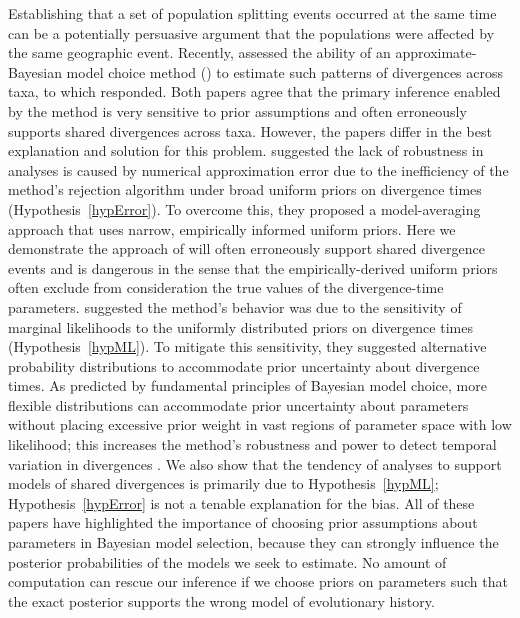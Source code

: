 Establishing that a set of population splitting events occurred at the same
time can be a potentially persuasive argument that the populations were
affected by the same geographic event.
Recently, \citet{Oaks2012} assessed the ability of an approximate-Bayesian
model choice method (\msb) to estimate such patterns of divergences across
taxa, to which \citet{Hickerson2013} responded.
Both papers agree that the primary inference enabled by the method is very
sensitive to prior assumptions and often erroneously supports shared
divergences across taxa.
However, the papers differ in the best explanation and solution for this
problem.
\citet{Hickerson2013} suggested the lack of robustness in \msb analyses is
caused by numerical approximation error due to the inefficiency of the method's
rejection algorithm under broad uniform priors on divergence times
(Hypothesis~\ref{hypError}).
To overcome this, they proposed a model-averaging approach that uses narrow,
empirically informed uniform priors.
Here we demonstrate the approach of \citet{Hickerson2013} will often
erroneously support shared divergence events and is dangerous in the sense that
the empirically-derived uniform priors often exclude from consideration the
true values of the divergence-time parameters.
\citet{Oaks2012} suggested the method's behavior was due to the sensitivity of
marginal likelihoods to the uniformly distributed priors on divergence times
(Hypothesis~\ref{hypML}).
To mitigate this sensitivity, they suggested alternative probability
distributions to accommodate prior uncertainty about divergence times.
As predicted by fundamental principles of Bayesian model choice, more flexible
distributions can accommodate prior uncertainty about parameters without
placing excessive prior weight in vast regions of parameter space with low
likelihood;
this increases the method's robustness and power to detect temporal variation
in divergences \citep{Oaks2014dpp}.
We also show that the tendency of \msb analyses to support models of shared
divergences is primarily due to Hypothesis~\ref{hypML};
Hypothesis~\ref{hypError} is not a tenable explanation for the bias.
All of these papers have highlighted the importance of choosing prior
assumptions about parameters in Bayesian model selection, because they can
strongly influence the posterior probabilities of the models we seek to
estimate.
No amount of computation can rescue our inference if we choose priors on
parameters such that the exact posterior supports the wrong model of
evolutionary history.
